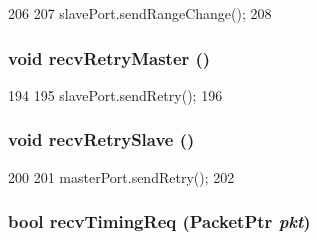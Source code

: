 \begin{DoxyCode}
206 {
207     slavePort.sendRangeChange();
208 }
\end{DoxyCode}
\hypertarget{classAddrMapper_a74fc0d5bf99b08c9899269e3dd7fab6a}{
\subsubsection[{recvRetryMaster}]{\setlength{\rightskip}{0pt plus 5cm}void recvRetryMaster ()}}
\label{classAddrMapper_a74fc0d5bf99b08c9899269e3dd7fab6a}



\begin{DoxyCode}
194 {
195     slavePort.sendRetry();
196 }
\end{DoxyCode}
\hypertarget{classAddrMapper_a2292f62803fe220e9629886f24aae91a}{
\subsubsection[{recvRetrySlave}]{\setlength{\rightskip}{0pt plus 5cm}void recvRetrySlave ()}}
\label{classAddrMapper_a2292f62803fe220e9629886f24aae91a}



\begin{DoxyCode}
200 {
201     masterPort.sendRetry();
202 }
\end{DoxyCode}
\hypertarget{classAddrMapper_a3344d9dd0f83257feab5424e761f31c6}{
\subsubsection[{recvTimingReq}]{\setlength{\rightskip}{0pt plus 5cm}bool recvTimingReq ({\bf PacketPtr} {\em pkt})}}
\label{classAddrMapper_a3344d9dd0f83257feab5424e761f31c6}



